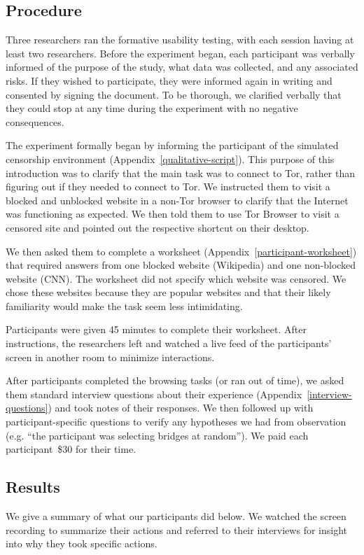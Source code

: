 \documentclass[USenglish,oneside,twocolumn]{article}
\begin{document}
\subsection{Procedure}
Three researchers ran the formative usability testing, with each session having at least two researchers.  
Before the experiment began, each participant was verbally informed of the purpose of the 
study, what data was collected, and any associated risks. If they wished to participate,
they were informed again in writing and consented by signing the document. To be thorough, 
we clarified verbally that they could stop at any time during the experiment with no negative consequences. 

The experiment formally began by informing the participant of the simulated censorship environment (Appendix~\ref{qualitative-script}). This purpose of this introduction was to clarify that the main task
was to connect to Tor, rather than figuring out if they needed to connect to Tor. 
We instructed them to visit a blocked and unblocked website
in a non-Tor browser to clarify that the Internet was functioning as expected. 
We then told them to use Tor Browser to visit a censored site and pointed out 
the respective shortcut on their desktop.

We then asked them to complete a worksheet (Appendix~\ref{participant-worksheet}) that 
required answers from one blocked website (Wikipedia) and one non-blocked website (CNN).
The worksheet did not specify which website was censored. 
We chose these websites because they are popular websites and that their likely familiarity 
would make the task seem less intimidating. 

Participants were given 45 minutes to complete their worksheet. 
After instructions, the researchers left and watched a live feed of the participants' screen in another room to minimize interactions.

After participants completed the browsing tasks (or ran out of time),
we asked them standard interview questions about their experience (Appendix~\ref{interview-questions}) and took notes of their responses. We then followed up with participant-specific questions to verify any hypotheses   we had from observation (e.g. ``the participant was selecting bridges at random''). We paid each participant~\$30 for their time. 

\subsection{Results} 
We give a summary of what our participants did below. We watched the screen recording to summarize their actions and referred to their interviews for insight into why they took specific actions. 
\end{document}
